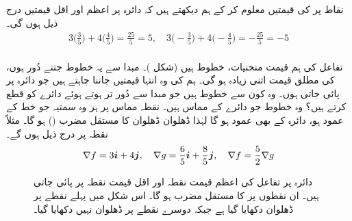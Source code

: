 نقاط    پر  کی قیمتیں معلوم کر کے ہم دیکھتے ہیں کہ دائرہ  پر  اعظم  اور اقل قیمتیں درج ذیل ہوں گی۔
\begin{align*}
3\big(\frac{3}{5}\big)+4\big(\frac{4}{5}\big)=\frac{25}{5}=5,\quad  3\big(-\frac{3}{5}\big)+4\big(-\frac{4}{5}\big)=-\frac{25}{5}=-5
\end{align*}  
\\
تفاعل  کی ہم قیمت منحنیات،  خطوط  ہیں (شکل )۔ مبدا سے یہ خطوط جتنے دُور ہوں،  کی مطلق قیمت اتنی زیادہ ہو گی۔ ہم  کی وہ انتہا قیمتیں جاننا چاہتے ہیں جو دائرہ  پر پائی جاتی  ہوں۔ وہ کون سے خطوط ہیں جو مبدا سے دُور تر  ہوتے ہوئے دائرے کو قطع کرتے ہیں؟ وہ خطوط جو دائرے کے مماس ہیں۔ نقطہ مماس پر ہر وہ سمتیہ  جو  خط  کے  عمود ہو، دائرہ کے بھی عمود ہو گا لہٰذا ڈھلوان   ڈھلوان  کا مستقل مضرب  ()  ہو گا۔  مثلاً نقطہ  پر درج ذیل ہوں گے۔
\begin{align*}
\nabla f=3{\boldsymbol{i}}+4{\boldsymbol{j}},\quad \nabla g=\frac{6}{5}{\boldsymbol{i}}+\frac{8}{5}{\boldsymbol{j}},\quad \nabla f=\frac{5}{2}\nabla g
\end{align*} 
\begin{figure}
\centering
{}
\caption{
دائرہ  پر تفاعل  کی اعظم قیمت نقطہ    اور اقل قیمت نقطہ  پر پائی جاتی ہیں۔ ان نقطوں پر   کا مستقل مضرب  ہو گا۔ اس شکل میں پہلے نقطے پر ڈھلوان دکھایا  گیا ہے جبکہ دوسرے نقطے  پر ڈھلوان نہیں دکھایا گیا۔ 
}
\label{شکل_مثال_کثیرالمتغیر_دائرہ_پر_انتہائی_قیمتیں_درکار}
\end{figure}


